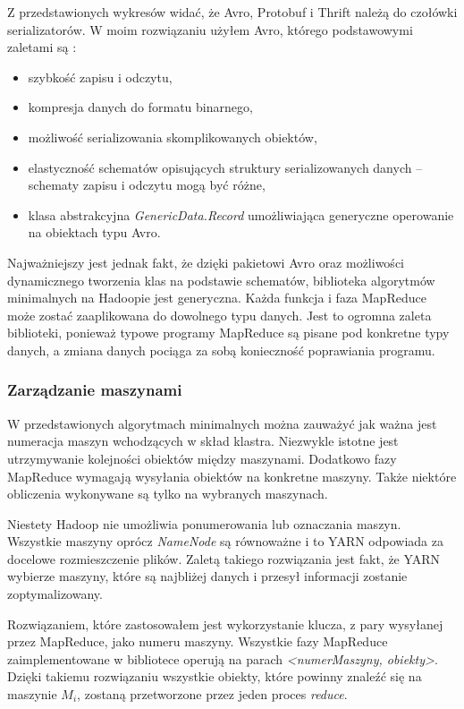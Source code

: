 \documentclass[magisterska]{pracamgr}
\begin{document}
Z przedstawionych wykresów widać, że Avro, Protobuf i Thrift należą do czołówki serializatorów. W moim rozwiązaniu użyłem Avro, którego podstawowymi zaletami są \cite{avro, protobuf, thrift}:
\begin{itemize}
    \item szybkość zapisu i odczytu,
    \item kompresja danych do formatu binarnego,
    \item możliwość serializowania skomplikowanych obiektów,
    \item elastyczność schematów opisujących struktury serializowanych danych -- schematy zapisu i odczytu mogą być różne,
    \item klasa abstrakcyjna \textit{GenericData.Record} umożliwiająca generyczne operowanie na obiektach typu Avro.
\end{itemize}

Najważniejszy jest jednak fakt, że dzięki pakietowi Avro oraz możliwości dynamicznego tworzenia klas na podstawie schematów, biblioteka algorytmów minimalnych na Hadoopie jest generyczna. Każda funkcja i faza MapReduce może zostać zaaplikowana do dowolnego typu danych. Jest to ogromna zaleta biblioteki, ponieważ typowe programy MapReduce są pisane pod konkretne typy danych, a zmiana danych pociąga za sobą konieczność poprawiania programu.

\subsubsection{Zarządzanie maszynami} \label{hadoop_zarzadzanie_maszynami}

W przedstawionych algorytmach minimalnych można zauważyć jak ważna jest numeracja maszyn wchodzących w skład klastra. Niezwykle istotne jest utrzymywanie kolejności obiektów między maszynami. Dodatkowo fazy MapReduce wymagają wysyłania obiektów na konkretne maszyny. Także niektóre obliczenia wykonywane są tylko na wybranych maszynach.

Niestety Hadoop nie umożliwia ponumerowania lub oznaczania maszyn. Wszystkie maszyny oprócz \textit{NameNode} są równoważne i to YARN odpowiada za docelowe rozmieszczenie plików. Zaletą takiego rozwiązania jest fakt, że YARN wybierze maszyny, które są najbliżej danych i przesył informacji zostanie zoptymalizowany.

Rozwiązaniem, które zastosowałem jest wykorzystanie klucza, z pary wysyłanej przez MapReduce, jako numeru maszyny. Wszystkie fazy MapReduce zaimplementowane w bibliotece operują na parach \textit{<numerMaszyny, obiekty>}. Dzięki takiemu rozwiązaniu wszystkie obiekty, które powinny znaleźć się na maszynie \(M_i\), zostaną przetworzone przez jeden proces \textit{reduce}.
\end{document}
